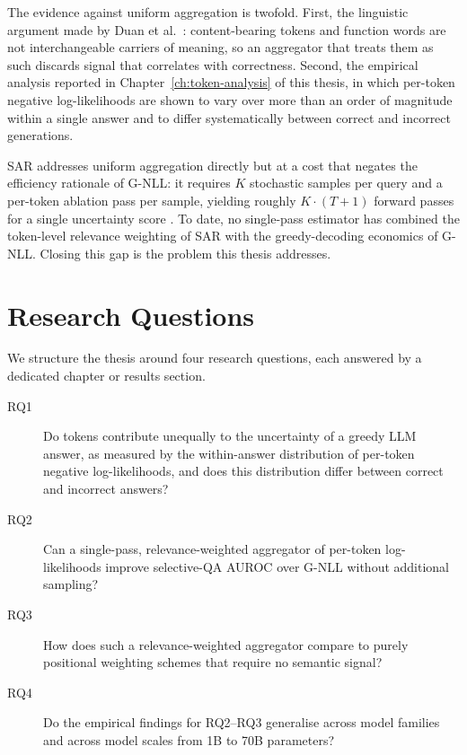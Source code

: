 \documentclass[a4paper,oneside,10pt,ngerman,english]{scrbook}
\begin{document}
The evidence against uniform aggregation is twofold. First, the linguistic
argument made by Duan et al.~\cite{duan2024sar}: content-bearing tokens and
function words are not interchangeable carriers of meaning, so an aggregator
that treats them as such discards signal that correlates with correctness.
Second, the empirical analysis reported in
Chapter~\ref{ch:token-analysis} of this thesis, in which per-token
negative log-likelihoods are shown to vary over more than an order of
magnitude within a single answer and to differ systematically between correct
and incorrect generations.

SAR addresses uniform aggregation directly but at a cost that negates the
efficiency rationale of G-NLL: it requires $K$ stochastic samples per query
and a per-token ablation pass per sample, yielding roughly $K{\cdot}(T{+}1)$
forward passes for a single uncertainty score \cite{duan2024sar}. To date, no
single-pass estimator has combined the token-level relevance weighting of SAR
with the greedy-decoding economics of G-NLL. Closing this gap is the problem
this thesis addresses.


\section{Research Questions}
\label{sec:rqs}
We structure the thesis around four research questions, each answered by a
dedicated chapter or results section.
\begin{description}
    \item[RQ1] Do tokens contribute unequally to the uncertainty of a greedy
    LLM answer, as measured by the within-answer distribution of per-token
    negative log-likelihoods, and does this distribution differ between
    correct and incorrect answers?
    \item[RQ2] Can a single-pass, relevance-weighted aggregator of per-token
    log-likelihoods improve selective-QA AUROC over G-NLL without additional
    sampling?
    \item[RQ3] How does such a relevance-weighted aggregator compare to
    purely positional weighting schemes that require no semantic signal?
    \item[RQ4] Do the empirical findings for RQ2--RQ3 generalise across
    model families and across model scales from 1B to 70B parameters?
\end{description}
\end{document}
